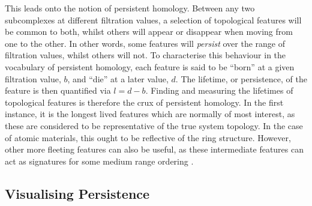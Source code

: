 This leads onto the notion of persistent homology.
Between any two subcomplexes at different filtration values, a selection of topological features will be common to both, whilst others will appear or disappear when moving from one to the other.
In other words, some features will \textit{persist} over the range of filtration values, whilst others will not.
To characterise this behaviour in the vocabulary of persistent homology, each feature is said to be ``born'' at a given filtration value, $b$, and ``die'' at a later value, $d$.
The lifetime, or persistence, of the feature is then quantified via $l=d-b$.
Finding and measuring the lifetimes of topological features is therefore the crux of persistent homology.
In the first instance, it is the longest lived features which are normally of most interest, as these are considered to be representative of the true system topology.
In the case of \td{} atomic materials, this ought to be reflective of the ring structure.
However, other more fleeting features can also be useful, as these intermediate features can act as signatures for some medium range ordering \cite{Nakamura2015,Onodera2019}. 

\subsection{Visualising Persistence}

